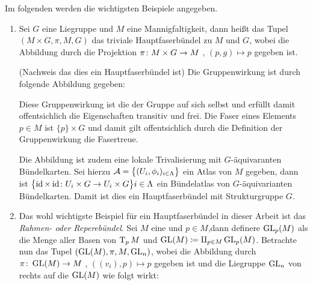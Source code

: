 Im folgenden werden die wichtigsten Beispiele angegeben.

\begin{Bsp}
  \begin{enumerate}[1)]
  \item Sei $G$ eine Liegruppe und $M$ eine Mannigfaltigkeit, dann
    heißt das Tupel $(M \times G, \pi, M, G)$ das triviale
    Hauptfaserbündel zu $M$ und $G$, wobei die Abbildung durch die
    Projektion $\pi \colon M \times G \rightarrow M$ , $(p,g) \mapsto p$ gegeben
    ist.
    \begin{smallproof}(Nachweis das dies ein Hauptfaserbündel ist) Die
      Gruppenwirkung ist durch folgende Abbildung gegeben:
		
      Diese Gruppenwirkung ist die der Gruppe auf sich selbst und
      erfüllt damit offentsichlich die Eigenschaften transitiv und
      frei. Die Faser eines Elements $p\in M$ ist $\{p\}\times G$ und
      damit gilt offentsichlich durch die Definition der
      Gruppenwirkung die Fasertreue.
		
      Die Abbildung ist zudem eine lokale Trivalisierung mit
      $G$-äquivaranten Bündelkarten. Sei hierzu
      $\mathcal{A}=\bigl\{ (U_i,\phi_i)_{i \in \Lambda} \bigr\}$ ein Atlas von
      $M$ gegeben, dann ist
      $ \bigl\{ \operatorname{id}\times\operatorname{id} \colon U_i \times G \rightarrow U_i\times G \bigr\}{i \in
        \Lambda} $
      ein Bündelatlas von $G$-äquivarianten Bündelkarten.  Damit ist
      dies ein Hauptfaserbündel mit Strukturgruppe $G$.
		\end{smallproof}
		
              \item Das wohl wichtigste Beispiel für ein
                Hauptfaserbündel in dieser Arbeit ist das
                \textit{Rahmen- oder Reperebündel}. Sei $M$ eine \mfg
                und $p \in M$,dann definere $\operatorname{GL}_p(M)$ als die Menge
                aller Basen von $\operatorname{T}_{p}M$ und
                $\operatorname{GL}(M) \coloneqq \amalg_{p \in M} \operatorname{GL}_p(M)$.
                Betrachte nun das Tupel $(\operatorname{GL}(M),\pi,M,\operatorname{GL}_n)$, wobei
                die Abbildung durch $\pi \colon \operatorname{GL}(M) \rightarrow M$ ,
                $((v_i),p) \mapsto p$ gegeben ist und die Liegruppe
                $\operatorname{GL}_n$ von rechts auf die \mfg $\operatorname{GL}(M)$ wie folgt
                wirkt:
		\begin{center}
		\end{center}
		\begin{smallproof}
			

\end{smallproof}
\end{enumerate}
\end{Bsp}
